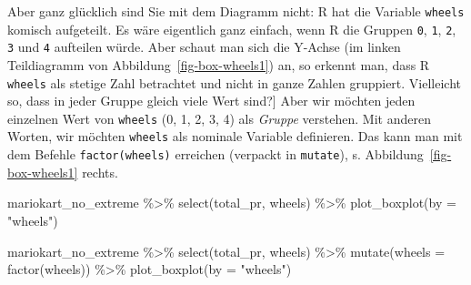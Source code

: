 \documentclass[
  letterpaper,
]{scrbook}
\newenvironment{Shaded}{\begin{snugshade}}{\end{snugshade}}
\newcommand{\AttributeTok}[1]{\textcolor[rgb]{0.40,0.45,0.13}{#1}}
\newcommand{\FunctionTok}[1]{\textcolor[rgb]{0.28,0.35,0.67}{#1}}
\newcommand{\NormalTok}[1]{\textcolor[rgb]{0.00,0.23,0.31}{#1}}
\newcommand{\SpecialCharTok}[1]{\textcolor[rgb]{0.37,0.37,0.37}{#1}}
\newcommand{\StringTok}[1]{\textcolor[rgb]{0.13,0.47,0.30}{#1}}
\theoremstyle{definition}
\theoremstyle{definition}
\theoremstyle{definition}
\theoremstyle{remark}
\begin{document}
Aber ganz glücklich sind Sie mit dem Diagramm nicht: R hat die Variable
\texttt{wheels} komisch aufgeteilt. Es wäre eigentlich ganz einfach,
wenn R die Gruppen \texttt{0}, \texttt{1}, \texttt{2}, \texttt{3} und
\texttt{4} aufteilen würde. Aber schaut man sich die Y-Achse (im linken
Teildiagramm von Abbildung~\ref{fig-box-wheels1}) an, so erkennt man,
dass R \texttt{wheels} als stetige Zahl betrachtet und nicht in ganze
Zahlen gruppiert. Vielleicht so, dass in jeder Gruppe gleich viele Wert
sind?{]} Aber wir möchten jeden einzelnen Wert von \texttt{wheels} (0,
1, 2, 3, 4) als \emph{Gruppe} verstehen. Mit anderen Worten, wir möchten
\texttt{wheels} als nominale Variable definieren. Das kann man mit dem
Befehle \texttt{factor(wheels)} erreichen (verpackt in \texttt{mutate}),
s. Abbildung~\ref{fig-box-wheels1} rechts.

\begin{Shaded}
\begin{Highlighting}[]

\NormalTok{mariokart\_no\_extreme }\SpecialCharTok{\%\textgreater{}\%} 
  \FunctionTok{select}\NormalTok{(total\_pr, wheels) }\SpecialCharTok{\%\textgreater{}\%} 
  \FunctionTok{plot\_boxplot}\NormalTok{(}\AttributeTok{by =} \StringTok{"wheels"}\NormalTok{)}

\NormalTok{mariokart\_no\_extreme }\SpecialCharTok{\%\textgreater{}\%} 
  \FunctionTok{select}\NormalTok{(total\_pr, wheels) }\SpecialCharTok{\%\textgreater{}\%} 
  \FunctionTok{mutate}\NormalTok{(}\AttributeTok{wheels =} \FunctionTok{factor}\NormalTok{(wheels)) }\SpecialCharTok{\%\textgreater{}\%} 
  \FunctionTok{plot\_boxplot}\NormalTok{(}\AttributeTok{by =} \StringTok{"wheels"}\NormalTok{)}
\end{Highlighting}
\end{Shaded}
\end{document}
